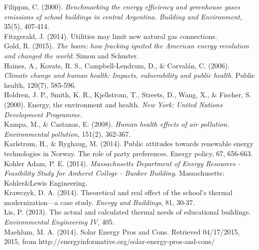 \hangindent=0.5in
Filippın, C. (2000). \emph{Benchmarking the energy efficiency and greenhouse gases emissions of school buildings in central Argentina. Building and Environment}, 35(5), 407-414. \\

\hangindent=0.5in
Fitzgerald, J. (2014). {Utilities may limit new natural gas connections}. \\

\hangindent=0.5in
Gold, R. (2015). \emph{The boom: how fracking ignited the American energy revolution and changed the world}: Simon and Schuster. \\

\hangindent=0.5in
Haines, A., Kovats, R. S., Campbell-Lendrum, D., \& Corvalán, C. (2006). \emph{Climate change and human health: Impacts, vulnerability and public health}. Public health, 120(7), 585-596. \\

\hangindent=0.5in
Holdren, J. P., Smith, K. R., Kjellstrom, T., Streets, D., Wang, X., \& Fischer, S. (2000). Energy, the environment and health. \emph{New York: United Nations Development Programme.} \\

\hangindent=0.5in
Kampa, M., \& Castanas, E. (2008). \emph{Human health effects of air pollution. Environmental pollution}, 151(2), 362-367. \\

\hangindent=0.5in
Karlstrøm, H., \& Ryghaug, M. (2014). Public attitudes towards renewable energy technologies in Norway. The role of party preferences. Energy policy, 67, 656-663. \\

\hangindent=0.5in
Kohler Adam, P. E. (2014). \emph{Massachusetts Department of Energy Resources -Feasibility Study for Amherst College - Bunker Building}. Massachusetts: Kohler\&Lewis Engineering. \\

\hangindent=0.5in
Krawczyk, D. A. (2014). Theoretical and real effect of the school's thermal modernization—a case study. \emph{Energy and Buildings}, 81, 30-37. \\

\hangindent=0.5in
Lis, P. (2013). The actual and calculated thermal needs of educational buildings. \emph{Environmental Engineering IV}, 405. \\

\hangindent=0.5in
Maehlum, M. A. (2014). Solar Energy Pros and Cons. Retrieved 04\slash 17\slash 2015, 2015, from http:\slash \slash energyinformative.org\slash solar-energy-pros-and-cons\slash  \\

